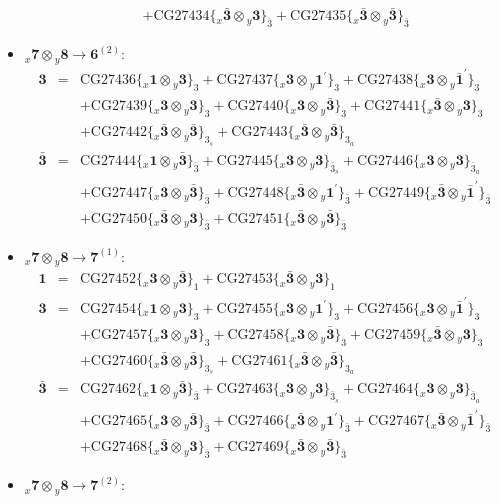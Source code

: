 \documentclass[english]{article}
\newcommand{\rep}[1]{\mathbf{#1}}
\newcommand{\repx}[2]{{}_{#2}\mathbf{#1}}
\newcommand{\subcg}[3]{\big\{ \repx{#1}{x}\otimes\repx{#2}{y}\big\}^{}_{#3}}
\begin{document}
\begin{itemize}
\begin{eqnarray*}
 & & +\text{CG27434}\subcg{\bar{3}}{3}{\bar{3}}+\text{CG27435}\subcg{\bar{3}}{\bar{3}}{\bar{3}}
\end{eqnarray*}
\item $\repx{7}{x}\otimes\repx{8}{y}\to\rep{6}^{(2)}$:
\begin{eqnarray*}
\rep{3} &=& \text{CG27436}\subcg{1}{3}{3}+\text{CG27437}\subcg{3}{1^{\prime}}{3}+\text{CG27438}\subcg{3}{\bar{1}^{\prime}}{3} \\ 
 & & +\text{CG27439}\subcg{3}{3}{3}+\text{CG27440}\subcg{3}{\bar{3}}{3}+\text{CG27441}\subcg{\bar{3}}{3}{3} \\ 
 & & +\text{CG27442}\subcg{\bar{3}}{\bar{3}}{3_{s}}+\text{CG27443}\subcg{\bar{3}}{\bar{3}}{3_{a}}
\\
\rep{\bar{3}} &=& \text{CG27444}\subcg{1}{\bar{3}}{\bar{3}}+\text{CG27445}\subcg{3}{3}{\bar{3}_{s}}+\text{CG27446}\subcg{3}{3}{\bar{3}_{a}} \\ 
 & & +\text{CG27447}\subcg{3}{\bar{3}}{\bar{3}}+\text{CG27448}\subcg{\bar{3}}{1^{\prime}}{\bar{3}}+\text{CG27449}\subcg{\bar{3}}{\bar{1}^{\prime}}{\bar{3}} \\ 
 & & +\text{CG27450}\subcg{\bar{3}}{3}{\bar{3}}+\text{CG27451}\subcg{\bar{3}}{\bar{3}}{\bar{3}}
\end{eqnarray*}
\item $\repx{7}{x}\otimes\repx{8}{y}\to\rep{7}^{(1)}$:
\begin{eqnarray*}
\rep{1} &=& \text{CG27452}\subcg{3}{\bar{3}}{1}+\text{CG27453}\subcg{\bar{3}}{3}{1}
\\
\rep{3} &=& \text{CG27454}\subcg{1}{3}{3}+\text{CG27455}\subcg{3}{1^{\prime}}{3}+\text{CG27456}\subcg{3}{\bar{1}^{\prime}}{3} \\ 
 & & +\text{CG27457}\subcg{3}{3}{3}+\text{CG27458}\subcg{3}{\bar{3}}{3}+\text{CG27459}\subcg{\bar{3}}{3}{3} \\ 
 & & +\text{CG27460}\subcg{\bar{3}}{\bar{3}}{3_{s}}+\text{CG27461}\subcg{\bar{3}}{\bar{3}}{3_{a}}
\\
\rep{\bar{3}} &=& \text{CG27462}\subcg{1}{\bar{3}}{\bar{3}}+\text{CG27463}\subcg{3}{3}{\bar{3}_{s}}+\text{CG27464}\subcg{3}{3}{\bar{3}_{a}} \\ 
 & & +\text{CG27465}\subcg{3}{\bar{3}}{\bar{3}}+\text{CG27466}\subcg{\bar{3}}{1^{\prime}}{\bar{3}}+\text{CG27467}\subcg{\bar{3}}{\bar{1}^{\prime}}{\bar{3}} \\ 
 & & +\text{CG27468}\subcg{\bar{3}}{3}{\bar{3}}+\text{CG27469}\subcg{\bar{3}}{\bar{3}}{\bar{3}}
\end{eqnarray*}
\item $\repx{7}{x}\otimes\repx{8}{y}\to\rep{7}^{(2)}$:

\end{itemize}
\end{document}
